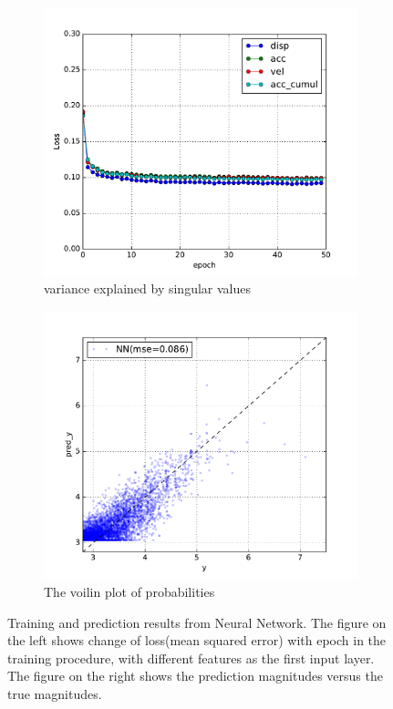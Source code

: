 \documentclass{article} %
\begin{document}
\begin{figure}[ht!]
\centering
\begin{subfigure}{0.48\textwidth}
\centering
\includegraphics[width = \textwidth]{./figure/nn_loss}
\caption{variance explained by singular values}
\label{fig:svd_left}
\end{subfigure}
\begin{subfigure}{0.48\textwidth}
\centering
\includegraphics[width = \textwidth]{./figure/nn_prediction}
\caption{The voilin plot of probabilities}
\label{fig:svd_right}
\end{subfigure}
\caption{Training and prediction results from Neural Network. The figure on the left shows change of loss(mean squared error) with epoch in the training procedure, with different features as the first input layer. The figure on the right shows the prediction magnitudes versus the true magnitudes.}
\label{fig:combined}
\end{figure}
\end{document}
